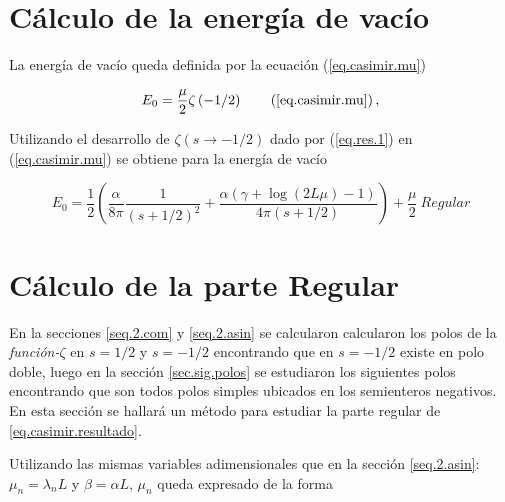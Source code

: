 \begin{comment}
\begin{equation}
\frac{1 }{2 \pi i}
\int _{circulo} \lambda ^{-2s } \partial \lambda \ Ln \left[
					\frac{e ^{\frac{i \alpha  \log ( 2 \lambda L )}{2 \lambda}} e ^{2 i \lambda L} S1}
					{\Gamma \left( 1 - \frac{i \alpha}{2 \lambda} \right)} - 
					\frac{e ^{\frac{-i \alpha  \log (2 \lambda L )}{2 \lambda}} S2}
					{\Gamma \left( 1 + \frac{i \alpha}{2 \lambda} \right)}					
					\right] d \lambda
\end{equation}
\end{comment}


\section{Cálculo de la energía de vacío}

La energía de vacío queda definida por la ecuación (\ref{eq.casimir.mu})

\begin{equation}
    E _0 = \frac{\mu }{2}  
    \zeta  \left( - 1/2 \right) 
    \tag{\ref{eq.casimir.mu}} \, ,
\end{equation}

Utilizando el desarrollo de $\zeta  (s \rightarrow -1/2)$ dado por (\ref{eq.res.1}) en (\ref{eq.casimir.mu}) se obtiene para la energía de vacío

\begin{equation}\label{eq.casimir.resultado}
E _0 = \frac{1}{2} \left(
				\frac{\alpha}{8 \pi  } \frac{1}{(s+1/2)^2} + 
				\frac{\alpha ( \gamma  +  \log (2L \mu ) -1 )}{4 \pi  (s+1/2)}
				\right) + 
				\frac{\mu}{2} \ Regular
\end{equation}

\section{Cálculo de la parte Regular}

En la secciones \ref{seq.2.com} y \ref{seq.2.asin} se calcularon calcularon los polos de la \mbox{{\it función-$\zeta$}} en $s=1/2$ y $s=-1/2$ encontrando que en $s=-1/2$ existe en polo doble, luego en la sección \ref{sec.sig.polos} se estudiaron los siguientes polos encontrando que son todos polos simples ubicados en los semienteros negativos. En esta sección se hallará un método para estudiar la parte regular de \ref{eq.casimir.resultado}.

Utilizando las mismas variables adimensionales que en la sección \ref{seq.2.asin}: $\mu _n = \lambda _n L$ y $\beta = \alpha L$, $\mu _n$ queda expresado de la forma

